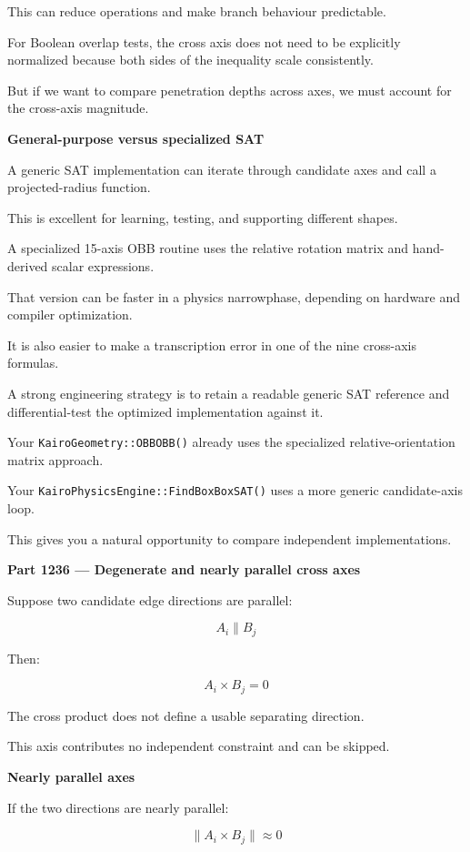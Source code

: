 This can reduce operations and make branch behaviour predictable.

For Boolean overlap tests, the cross axis does not need to be explicitly normalized because both sides of the inequality scale consistently.

But if we want to compare penetration depths across axes, we must account for the cross-axis magnitude.

\textbf{General-purpose versus specialized SAT}

A generic SAT implementation can iterate through candidate axes and call a projected-radius function.

This is excellent for learning, testing, and supporting different shapes.

A specialized 15-axis OBB routine uses the relative rotation matrix and hand-derived scalar expressions.

That version can be faster in a physics narrowphase, depending on hardware and compiler optimization.

It is also easier to make a transcription error in one of the nine cross-axis formulas.

A strong engineering strategy is to retain a readable generic SAT reference and differential-test the optimized implementation against it.

Your \texttt{KairoGeometry::OBBOBB()} already uses the specialized relative-orientation matrix approach.

Your \texttt{KairoPhysicsEngine::FindBoxBoxSAT()} uses a more generic candidate-axis loop.

This gives you a natural opportunity to compare independent implementations.

\textbf{Part 1236 --- Degenerate and nearly parallel cross axes}

Suppose two candidate edge directions are parallel:

\[
A_i\parallel B_j
\]

Then:

\[
\boxed{ A_i\times B_j=0 }
\]

The cross product does not define a usable separating direction.

This axis contributes no independent constraint and can be skipped.

\textbf{Nearly parallel axes}

If the two directions are nearly parallel:

\[
\|A_i\times B_j\|\approx0
\]

